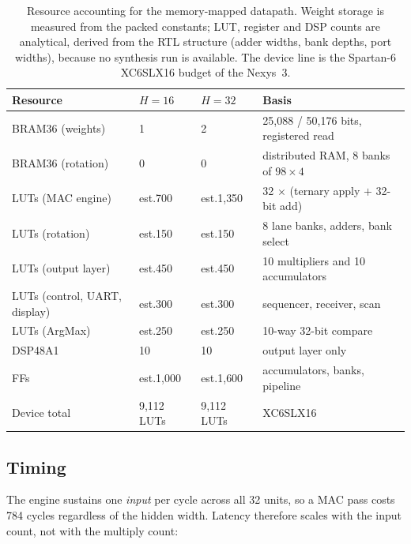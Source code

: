 \documentclass[11pt,a4paper]{article}
\newcommand{\good}{\textcolor{good}{\textbf{}}}
\newcommand{\est}{\textcolor{warn}{est.}}
\begin{document}
\begin{table}[H]
\centering
\small
\caption{Resource accounting for the memory-mapped datapath. Weight storage is
  measured from the packed constants; LUT, register and DSP counts are
  analytical, derived from the RTL structure (adder widths, bank depths, port
  widths), because no synthesis run is available. The device line is the
  Spartan-6 XC6SLX16 budget of the Nexys~3.}
\label{tab:resources}
\begin{tabularx}{\linewidth}{@{}lY Y Y@{}}
\toprule
\textbf{Resource} & \textbf{$H{=}16$} & \textbf{$H{=}32$} & \textbf{Basis} \\
\midrule
BRAM36 (weights)    & \good 1 & \good 2 & 25{,}088 / 50{,}176 bits, registered read \\
BRAM36 (rotation)   & \good 0 & \good 0 & distributed RAM, 8 banks of $98\times4$ \\
LUTs (MAC engine)   & \est 700 & \est 1{,}350 & 32 $\times$ (ternary apply $+$ 32-bit add) \\
LUTs (rotation)     & \est 150 & \est 150 & 8 lane banks, adders, bank select \\
LUTs (output layer) & \est 450 & \est 450 & 10 multipliers and 10 accumulators \\
LUTs (control, UART, display) & \est 300 & \est 300 & sequencer, receiver, scan \\
LUTs (ArgMax)       & \est 250 & \est 250 & 10-way 32-bit compare \\
DSP48A1             & 10 & 10 & output layer only \\
FFs                 & \est 1{,}000 & \est 1{,}600 & accumulators, banks, pipeline \\
\midrule
Device total        & 9{,}112 LUTs & 9{,}112 LUTs & XC6SLX16 \\
\bottomrule
\end{tabularx}
\end{table}

\subsection{Timing}

The engine sustains one \emph{input} per cycle across all 32 units, so a MAC
pass costs 784 cycles regardless of the hidden width. Latency therefore scales
with the input count, not with the multiply count:
\end{document}
